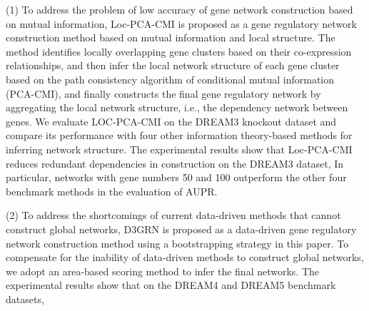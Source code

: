 \begin{abstracten}
(1) To address the problem of low accuracy of gene network construction based on mutual information, Loc-PCA-CMI is proposed as a gene regulatory network construction method based on mutual information and local structure.
The method identifies locally overlapping gene clusters based on their co-expression relationships, and then infer the local network structure of each gene cluster based on the path consistency algorithm of conditional mutual information (PCA-CMI), 
and finally constructs the final gene regulatory network by aggregating the local network structure, i.e., the dependency network between genes.
We evaluate LOC-PCA-CMI on the DREAM3 knockout dataset and compare its performance with four other information theory-based methods for inferring network structure.
The experimental results show that Loc-PCA-CMI reduces redundant dependencies in construction on the DREAM3 dataset,
In particular, networks with gene numbers 50 and 100 outperform the other four benchmark methods in the evaluation of AUPR.



(2) To address the shortcomings of current data-driven methods that cannot construct global networks, 
D3GRN is proposed as a data-driven gene regulatory network construction method using a bootstrapping strategy in this paper.
To compensate for the inability of data-driven methods to construct global networks, 
we adopt an area-based scoring method to infer the final networks. 
The experimental results show that on the DREAM4 and DREAM5 benchmark datasets,


\end{abstracten}
